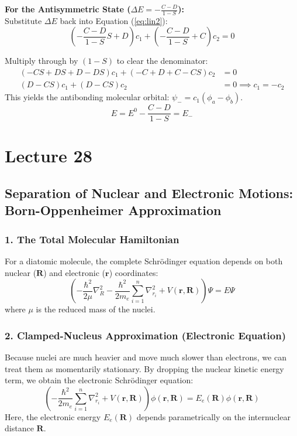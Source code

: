\documentclass{book}
\begin{document}
\textbf{For the Antisymmetric State ($\Delta E = -\frac{C-D}{1-S}$):} \\
Substitute $\Delta E$ back into Equation (\ref{eq:lin2}):
\begin{equation}
    \left( -\frac{C-D}{1-S}S + D \right)c_1 + \left( -\frac{C-D}{1-S} + C \right)c_2 = 0
\end{equation}

Multiply through by $(1-S)$ to clear the denominator:
\begin{align*}
    (-CS + DS + D - DS)c_1 + (-C + D + C - CS)c_2 &= 0 \\
    (D - CS)c_1 + (D - CS)c_2 &= 0 \implies c_1 = -c_2
\end{align*}
This yields the antibonding molecular orbital: $\psi_- = c_1(\phi_a - \phi_b)$.
$$E=E^0 - \frac{C-D}{1-S} = E_-$$


\chapter{Lecture 28}
\section*{Separation of Nuclear and Electronic Motions: Born-Oppenheimer Approximation}

\subsection*{1. The Total Molecular Hamiltonian}
For a diatomic molecule, the complete Schrödinger equation depends on both nuclear ($\mathbf{R}$) and electronic ($\mathbf{r}$) coordinates:
\begin{equation}
    \left( -\frac{\hbar^2}{2\mu} \nabla_R^2 - \frac{\hbar^2}{2m_e} \sum_{i=1}^n \nabla_{r_i}^2 + V(\mathbf{r}, \mathbf{R}) \right) \Psi = E \Psi
\end{equation}
where $\mu$ is the reduced mass of the nuclei.

\subsection*{2. Clamped-Nucleus Approximation (Electronic Equation)}
Because nuclei are much heavier and move much slower than electrons, we can treat them as momentarily stationary. By dropping the nuclear kinetic energy term, we obtain the electronic Schrödinger equation:
\begin{equation}
    \left( -\frac{\hbar^2}{2m_e} \sum_{i=1}^n \nabla_{r_i}^2 + V(\mathbf{r}, \mathbf{R}) \right) \phi(\mathbf{r}, \mathbf{R}) = E_e(\mathbf{R}) \phi(\mathbf{r}, \mathbf{R}) \label{eq:electronic}
\end{equation}
Here, the electronic energy $E_e(\mathbf{R})$ depends parametrically on the internuclear distance $\mathbf{R}$.
\end{document}
